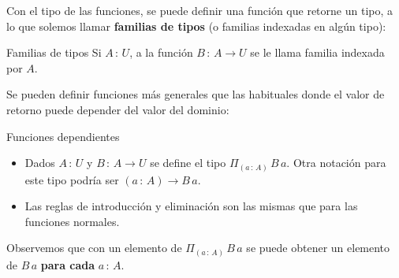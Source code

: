 \documentclass[xcolor=dvipsnames]{beamer} %
\newcommand{\tjud}[2]
  {\ensuremath{#1\,:\,#2}}
\newcommand{\depFun}[3] {
  {\ensuremath{\Pi_{(\tjud{#1}{#2})}\,#3\,#1}}
 }
\begin{document}
\begin{frame}
    \begin{block}{}
     Con el tipo de las funciones, se puede definir una función que retorne un tipo, a lo que solemos
     llamar \textbf{familias de tipos} (o familias indexadas en algún tipo):
    \end{block}

    \pause
   
   \begin{block}{Familias de tipos}
      Si $\tjud{A}{U}$, a la función $\tjud{B}{A \rightarrow U}$ se le llama familia indexada por $A$.
  \end{block}

\end{frame}

\begin{frame}
    \begin{block}{}
     Se pueden definir funciones más generales que las habituales donde el valor de retorno puede depender
     del valor del dominio:
    \end{block}
  
   \pause

    \begin{block}{Funciones dependientes}
      \begin{itemize}
       \item Dados $\tjud{A}{U}$ y $\tjud{B}{A \rightarrow U}$ se define el tipo $\depFun{a}{A}{B}$. Otra notación para
             este tipo podría ser $(\tjud{a}{A}) \rightarrow B\,a$.
       \item Las reglas de introducción y eliminación son las mismas que para las funciones normales.
      \end{itemize}
    \end{block}
    
    \pause
    
    \begin{block}{}
     Observemos que con un elemento de $\depFun{a}{A}{B}$ se puede obtener un elemento de $B\,a$ \textbf{para cada}
     $\tjud{a}{A}$.
    \end{block}

\end{frame}
\end{document}
